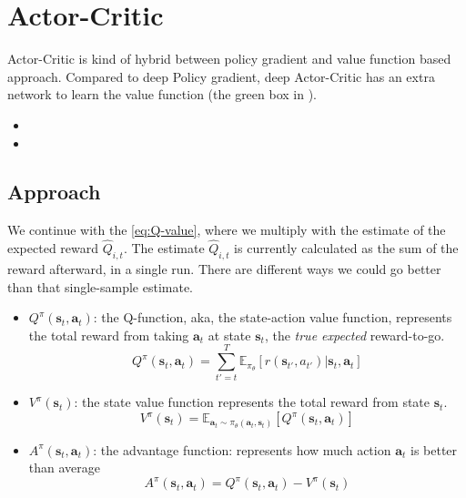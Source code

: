 \chapter{Actor-Critic}
Actor-Critic is kind of hybrid between policy gradient and value function based approach. Compared to deep Policy gradient, deep Actor-Critic has an extra network to learn the value function (the green box in ).
\begin{itemize}
	\item {}
	\item {}
\end{itemize}

\section{Approach}
We continue with the \eqref{eq:Q-value}, where we multiply with the estimate of the expected reward $\widehat{Q}_{i,t}$. The estimate $\widehat{Q}_{i,t}$ is currently calculated as the sum of the reward afterward, in a single run. There are different ways we could go better than that single-sample estimate.

\begin{itemize}
	\item $Q^\pi(\textbf{s}_t, \textbf{a}_t)$: the Q-function, \ac{aka}, the state-action value function, represents the total reward from taking $\textbf{a}_t$ at state $\textbf{s}_t$, the \textit{true expected} reward-to-go.
	\begin{equation}
		Q^\pi(\textbf{s}_t, \textbf{a}_t) = \sum_{t'=t}^T \mathbb{E}_{\pi_{\theta}}[r(\textbf{s}_{t'}, a_{t'})|\textbf{s}_t, \textbf{a}_t]
		\label{eq:q-function}
	\end{equation}
	\item $V^\pi(\textbf{s}_t)$: the state value function represents the total reward from state $\textbf{s}_t$.
	\begin{equation}
		V^\pi(\textbf{s}_t) = \mathbb{E}_{\textbf{a}_t \sim \pi_{\theta}(\textbf{a}_t, \textbf{s}_t)} [Q^\pi(\textbf{s}_t, \textbf{a}_t)]
	\end{equation}
	\item $A^\pi(\textbf{s}_t, \textbf{a}_t)$: the advantage function: represents how much action $\textbf{a}_t$ is better than average
	\begin{equation}
		A^\pi(\textbf{s}_t, \textbf{a}_t) = Q^\pi(\textbf{s}_t, \textbf{a}_t) - V^\pi(\textbf{s}_t)
		\label{eq:a-function}
	\end{equation}
\end{itemize}

